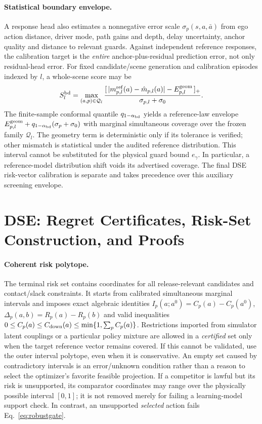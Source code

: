 \documentclass[10pt]{article}
\begin{document}
\paragraph{Statistical boundary envelope.}
A response head also estimates a nonnegative error scale $\sigma_p(s,a,\bar a)$ from ego action distance, driver mode, path gains and depth, delay uncertainty, anchor quality and distance to relevant guards. Against independent reference responses, the calibration target is the \emph{entire} anchor-plus-residual prediction error, not only residual-head error. For fixed candidate/scene generation and calibration episodes indexed by $l$, a whole-scene score may be
\begin{equation}
 S_l^{\rm bd}=\max_{(a,p)\in\mathcal Q_l}
 \frac{[\,|m_{p,l}^{\rm ref}(a)-\hat m_{p,l}(a)|-E_{p,l}^{\rm geom}\,]_+}
 {\sigma_{p,l}+\sigma_0}.
 \label{eq:boundaryscore}
\end{equation}
The finite-sample conformal quantile $q_{1-\alpha_{\rm bd}}$ yields a reference-law envelope $E_{p,l}^{\rm geom}+q_{1-\alpha_{\rm bd}}(\sigma_p+\sigma_0)$ with marginal simultaneous coverage over the frozen family $\mathcal Q_l$. The geometry term is deterministic only if its tolerance is verified; other mismatch is statistical under the audited reference distribution. This interval cannot be substituted for the physical guard bound $e_\gamma$. In particular, a reference-model distribution shift voids its advertised coverage. The final DSE risk-vector calibration is separate and takes precedence over this auxiliary screening envelope.

\section{DSE: Regret Certificates, Risk-Set Construction, and Proofs}
\label{app:regret}
\paragraph{Coherent risk polytope.}
The terminal risk set contains coordinates for all release-relevant candidates and contact/slack constraints. It starts from calibrated simultaneous marginal intervals and imposes exact algebraic identities $I_p(a;a^0)=C_p(a)-C_p(a^0)$, $\Delta_p(a,b)=R_p(a)-R_p(b)$ and valid inequalities $0\le C_p(a)\le C_{\rm down}(a)\le\min\{1,\sum_pC_p(a)\}$. Restrictions imported from simulator latent couplings or a particular policy mixture are allowed in a \emph{certified} set only when the target reference vector remains covered. If this cannot be validated, use the outer interval polytope, even when it is conservative. An empty set caused by contradictory intervals is an error/unknown condition rather than a reason to select the optimizer's favorite feasible projection. If a competitor is lawful but its risk is unsupported, its comparator coordinates may range over the physically possible interval $[0,1]$; it is not removed merely for failing a learning-model support check. In contrast, an unsupported \emph{selected} action fails Eq.~\eqref{eq:robustgate}.
\end{document}
